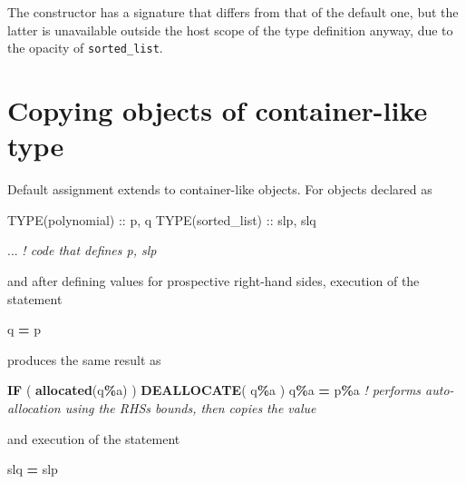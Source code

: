 \documentclass[
  paper=a4,
  ,captions=tableheading
]{scrartcl}
\newenvironment{Shaded}{\begin{snugshade}}{\end{snugshade}}
\newcommand{\CommentTok}[1]{\textcolor[rgb]{0.56,0.35,0.01}{\textit{#1}}}
\newcommand{\DataTypeTok}[1]{\textcolor[rgb]{0.13,0.29,0.53}{#1}}
\newcommand{\FunctionTok}[1]{\textcolor[rgb]{0.13,0.29,0.53}{\textbf{#1}}}
\newcommand{\KeywordTok}[1]{\textcolor[rgb]{0.13,0.29,0.53}{\textbf{#1}}}
\newcommand{\NormalTok}[1]{#1}
\newcommand{\OperatorTok}[1]{\textcolor[rgb]{0.81,0.36,0.00}{\textbf{#1}}}
\begin{document}
The constructor has a signature that differs from that of the default
one, but the latter is unavailable outside the host scope of the type
definition anyway, due to the opacity of \texttt{sorted\_list}.

\section{Copying objects of container-like
type}\label{copying-objects-of-container-like-type}

Default assignment extends to container-like objects. For objects
declared as

\begin{Shaded}
\begin{Highlighting}[]
\DataTypeTok{TYPE(polynomial)} \DataTypeTok{::}\NormalTok{ p, q}
\DataTypeTok{TYPE(sorted\_list)} \DataTypeTok{::}\NormalTok{ slp, slq}

\NormalTok{... }\CommentTok{! code that defines p, slp}
\end{Highlighting}
\end{Shaded}

and after defining values for prospective right-hand sides, execution of
the statement

\begin{Shaded}
\begin{Highlighting}[]
\NormalTok{q }\KeywordTok{=}\NormalTok{ p}
\end{Highlighting}
\end{Shaded}

produces the same result as

\begin{Shaded}
\begin{Highlighting}[]
\KeywordTok{IF}\NormalTok{ ( }\FunctionTok{allocated}\NormalTok{(q}\OperatorTok{\%}\NormalTok{a) ) }\KeywordTok{DEALLOCATE}\NormalTok{( q}\OperatorTok{\%}\NormalTok{a )}
\NormalTok{q}\OperatorTok{\%}\NormalTok{a }\KeywordTok{=}\NormalTok{ p}\OperatorTok{\%}\NormalTok{a  }\CommentTok{! performs auto{-}allocation using the RHS\textquotesingle{}s bounds, then copies the value}
\end{Highlighting}
\end{Shaded}

and execution of the statement

\begin{Shaded}
\begin{Highlighting}[]
\NormalTok{slq }\KeywordTok{=}\NormalTok{ slp}
\end{Highlighting}
\end{Shaded}
\end{document}
